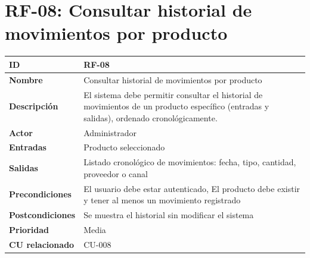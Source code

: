 \documentclass{article}
\begin{document}
\section*{RF-08: Consultar historial de movimientos por producto}
\begin{center}
\renewcommand{\arraystretch}{1.4}
\begin{tabular}{|L{4cm}|L{12cm}|}
\hline
\textbf{ID} & RF-08 \\
\hline
\textbf{Nombre} & Consultar historial de movimientos por producto \\
\hline
\textbf{Descripción} & El sistema debe permitir consultar el historial de movimientos de un producto específico (entradas y salidas), ordenado cronológicamente. \\
\hline
\textbf{Actor} & Administrador \\
\hline
\textbf{Entradas} & Producto seleccionado \\
\hline
\textbf{Salidas} & Listado cronológico de movimientos: fecha, tipo, cantidad, proveedor o canal \\
\hline
\textbf{Precondiciones} & El usuario debe estar autenticado, El producto debe existir y tener al menos un movimiento registrado \\
\hline
\textbf{Postcondiciones} & Se muestra el historial sin modificar el sistema \\
\hline
\textbf{Prioridad} & Media \\
\hline
\textbf{CU relacionado} & CU-008 \\
\hline
\end{tabular}
\end{center}
\end{document}
